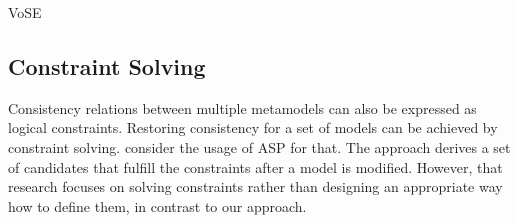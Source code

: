 \begin{copiedFrom}{VoSE}
\subsection*{Constraint Solving}

Consistency relations between multiple metamodels can also be expressed as logical constraints.
Restoring consistency for a set of models can be achieved by constraint solving.
\textcite{eramo2008a} consider the usage of \gls{ASP} for that. %
The approach derives a set of candidates that fulfill the constraints after a model is modified. %
However, that research focuses on solving constraints rather than designing an appropriate way how to define them, in contrast to our \commonalities approach.

\end{copiedFrom} %


